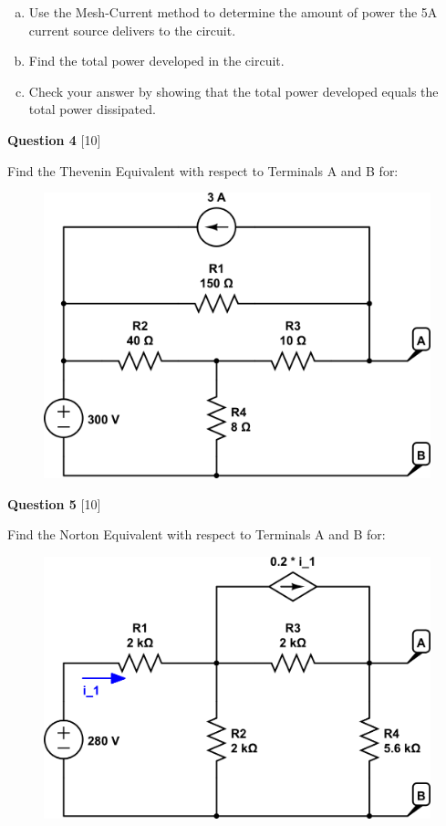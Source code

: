 \documentclass[12pt]{article}
\begin{document}
\begin{enumerate}[(a)]
\item Use the Mesh-Current method to determine the amount of power the 5A current source delivers to the circuit.
\item Find the total power developed in the circuit.
\item Check your answer by showing that the total power developed equals the total power dissipated.
\end{enumerate}

{\bf Question 4} [10] %

Find the Thevenin Equivalent with respect to Terminals A and B for:

\begin{figure}[h!]
\begin{center}
 \includegraphics[scale=0.4]{fig4_67.png}
\end{center}
\end{figure}

\newpage

{\bf Question 5} [10] %

Find the Norton Equivalent with respect to Terminals A and B for:

\begin{figure}[h!]
\begin{center}
 \includegraphics[scale=0.4]{fig4_75.png}
\end{center}
\end{figure}


 
\end{document}
